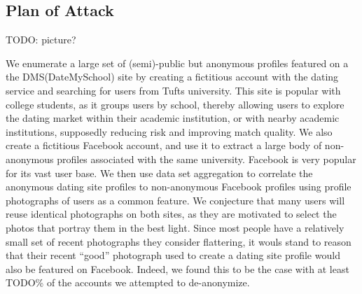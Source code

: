 \subsection{Plan of Attack}
\label{sec:intro_plan_of_attack}

TODO: picture?

We enumerate a large set of (semi)-public but anonymous profiles featured on a the DMS(DateMySchool\cite{dms2014}) site by creating a fictitious account with the dating service and searching for users from Tufts university.
This site is popular with college students, as it groups users by school, thereby allowing users to explore the dating market within their academic institution, or with nearby academic institutions, supposedly reducing risk and improving match quality.
We also create a fictitious Facebook\cite{fb2014} account, and use it to extract a large body of non-anonymous profiles associated with the same university.
Facebook is very popular for its vast user base.
We then use data set aggregation to correlate the anonymous dating site profiles to non-anonymous Facebook profiles using profile photographs of users as a common feature.
We conjecture that many users will reuse identical photographs on both sites, as they are motivated to select the photos that portray them in the best light.
Since most people have a relatively small set of recent photographs they consider flattering, it wouls stand to reason that their recent ``good'' photograph used to create a dating site profile would also be featured on Facebook.
Indeed, we found this to be the case with at least TODO\% of the accounts we attempted to de-anonymize.
